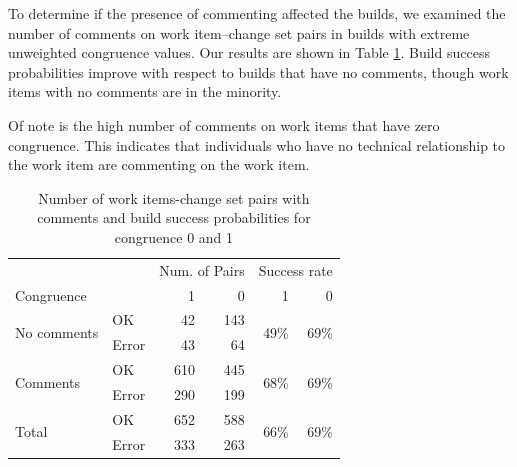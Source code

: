 \documentclass[12pt,oneside]{book}
\begin{document}





To determine if the presence of commenting affected the builds, we examined the number of comments on work item--change set pairs in builds with extreme unweighted congruence values. Our results are shown in Table \ref{tab:changeset_commenters}. Build success probabilities improve with respect to builds that have no comments, though work items with no comments are in the minority.

Of note is the high number of comments on work items that have zero congruence. This indicates that individuals who have no technical relationship to the work item are commenting on the work item.

\begin{table}[t]
\centering
\begin{tabular}{ll|rr|rr}
& & \multicolumn{2}{c|}{Num. of Pairs} & \multicolumn{2}{c}{Success rate} \\
Congruence &                                & 1     & 0   & 1 & 0 \\\hline 
\multirow{2}{*}{No comments} 	& OK 	  & 42   & 143  &  \multirow{2}{*}{49\%} & \multirow{2}{*}{69\%}  \\
                            	& Error   & 43    & 64   &  & \\\hline
\multirow{2}{*}{Comments} 	& OK 	  & 610  & 445  & \multirow{2}{*}{68\%} & \multirow{2}{*}{69\%}  \\
                         	& Error   & 290   & 199  &  & \\\hline
\multirow{2}{*}{Total} 		& OK		  & 652 & 588 &     \multirow{2}{*}{66\%} & \multirow{2}{*}{69\%}   \\
                       		& Error   & 333  & 263 & &\\
\end{tabular}
\caption{Number of work items-change set pairs with comments and build success probabilities for congruence 0 and 1}
\label{tab:changeset_commenters}
\end{table}
\end{document}
